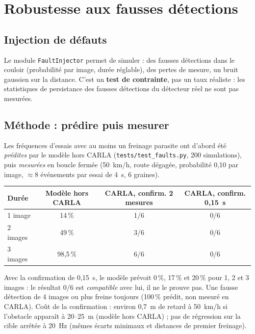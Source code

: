 \documentclass[11pt,a4paper]{article}
\newcommand{\code}[1]{\texttt{#1}}
\begin{document}
\section{Robustesse aux fausses d\'etections}
\subsection{Injection de d\'efauts}
Le module \code{FaultInjector} permet de simuler : des fausses d\'etections dans le couloir (probabilit\'e par image, dur\'ee r\'eglable), des pertes de mesure, un bruit gaussien sur la distance.
C'est un \textbf{test de contrainte}, pas un taux r\'ealiste : les statistiques de persistance des fausses d\'etections du d\'etecteur r\'eel ne sont pas mesur\'ees.

\subsection{M\'ethode : pr\'edire puis mesurer}
Les fr\'equences d'essais avec au moins un freinage parasite ont d'abord \'et\'e \emph{pr\'edites} par le mod\`ele hors CARLA (\code{tests/test\_faults.py}, 200 simulations), puis \emph{mesur\'ees} en boucle ferm\'ee
(50~km/h, route d\'egag\'ee, probabilit\'e 0,10 par image, $\approx8$ \'ev\'enements par essai de 4~s, 6 graines).
\begin{center}\small\begin{tabular}{@{}lccc@{}}\toprule
Dur\'ee & Mod\`ele hors CARLA & CARLA, confirm. 2 mesures & CARLA, confirm. 0,15~s \\\midrule
1 image & 14\,\% & 1/6 & 0/6 \\
2 images & 49\,\% & 3/6 & 0/6 \\
3 images & 98,5\,\% & 6/6 & 0/6 \\
\bottomrule\end{tabular}\end{center}
Avec la confirmation de 0,15~s, le mod\`ele pr\'evoit 0\,\%, 17\,\% et 20\,\% pour 1, 2 et 3 images : le r\'esultat 0/6 est \emph{compatible} avec lui, il ne le prouve pas. Une fausse d\'etection de 4 images ou plus
freine toujours (100\,\% pr\'edit, non mesur\'e en CARLA). Co\^ut de la confirmation : environ 0,7~m de retard \`a 50~km/h si l'obstacle appara\^it \`a 20--25~m (mod\`ele hors CARLA) ; pas de r\'egression sur la cible
arr\^et\'ee \`a 20~Hz (m\^emes \'ecarts minimaux et distances de premier freinage).
\end{document}
